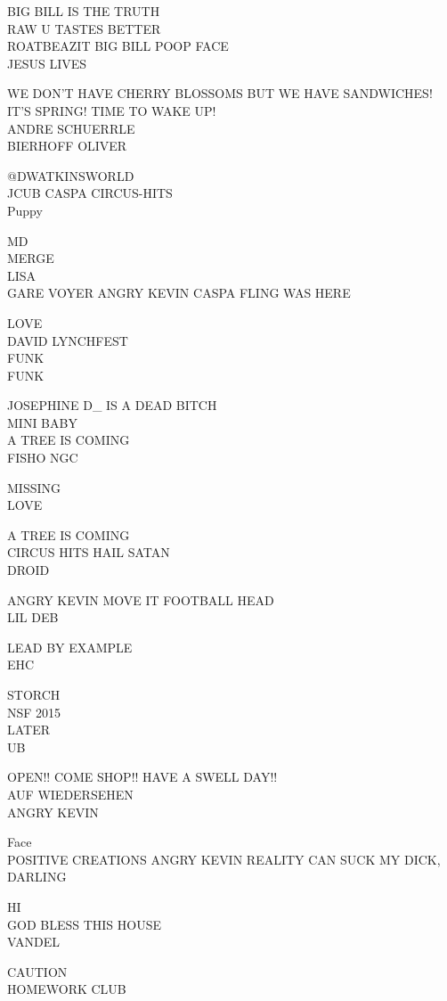 \documentclass[10pt,letterpaper]{article}
\begin{document}
BIG BILL IS THE TRUTH\\
RAW U TASTES BETTER\\
ROATBEAZIT BIG BILL POOP FACE\\
JESUS LIVES

WE DON'T HAVE CHERRY BLOSSOMS BUT WE HAVE SANDWICHES!\\
IT'S SPRING! TIME TO WAKE UP!\\
ANDRE SCHUERRLE\\
BIERHOFF OLIVER

@DWATKINSWORLD\\
JCUB CASPA CIRCUS{-}HITS\\
Puppy

MD\\
MERGE\\
LISA\\
GARE VOYER ANGRY KEVIN CASPA FLING WAS HERE

LOVE\\
DAVID LYNCHFEST\\
FUNK\\
FUNK

JOSEPHINE D\_ IS A DEAD BITCH\\
MINI BABY\\
A TREE IS COMING\\
FISHO NGC

MISSING\\
LOVE

A TREE IS COMING\\
CIRCUS HITS HAIL SATAN\\
DROID

ANGRY KEVIN MOVE IT FOOTBALL HEAD\\
LIL DEB

LEAD BY EXAMPLE\\
EHC

STORCH\\
NSF 2015\\
LATER\\
UB

OPEN!! COME SHOP!! HAVE A SWELL DAY!!\\
AUF WIEDERSEHEN\\
ANGRY KEVIN

Face\\
POSITIVE CREATIONS ANGRY KEVIN REALITY CAN SUCK MY DICK, DARLING

HI\\
GOD BLESS THIS HOUSE\\
VANDEL

CAUTION\\
HOMEWORK CLUB
\end{document}
